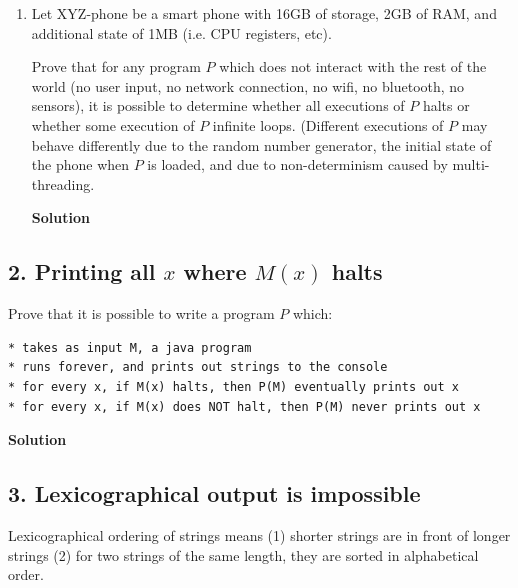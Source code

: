 \documentclass{article}\usepackage{amsmath,amssymb,amsthm,tikz,tkz-graph,color,chngpage,soul,hyperref,csquotes,graphicx,floatrow}\newcommand*{\QEDB}{\hfill\ensuremath{\square}}\newtheorem*{prop}{Proposition}\renewcommand{\theenumi}{\alph{enumi}}\usepackage[shortlabels]{enumitem}\usepackage[nobreak=true]{mdframed}\usetikzlibrary{matrix,calc}\MakeOuterQuote{"}\usepackage[margin=0.75in]{geometry} \newtheorem{theorem}{Theorem}
\begin{document}
\begin{enumerate}
\begin{mdframed}
\end{mdframed}
\item Let XYZ-phone be a smart phone with 16GB of storage, 2GB of RAM, and additional state of 1MB (i.e. CPU registers, etc).

\vspace{1mm}

\noindent Prove that for any program $P$ which does not interact with the rest of the world (no user input, no network connection, no wifi, no bluetooth, no sensors), it is possible to determine whether all executions of $P$ halts or whether some execution of $P$ infinite loops. (Different executions of $P$ may behave differently due to the random number generator, the initial state of the phone when $P$ is loaded, and due to non-determinism caused by multi-threading.
\begin{mdframed}
\textbf{Solution}

\end{mdframed}
\end{enumerate}

\clearpage

\subsection*{2. Printing all $x$ where $M(x)$ halts}
Prove that it is possible to write a program $P$ which:
\begin{center}
\begin{BVerbatim}
* takes as input M, a java program
* runs forever, and prints out strings to the console
* for every x, if M(x) halts, then P(M) eventually prints out x
* for every x, if M(x) does NOT halt, then P(M) never prints out x
\end{BVerbatim}
\end{center}
\begin{mdframed}
\textbf{Solution}

\end{mdframed}
\clearpage

\subsection*{3. Lexicographical output is impossible}
Lexicographical ordering of strings means (1) shorter strings are in front of longer strings (2) for two strings of the same length, they are sorted in alphabetical order.

\vspace{1mm}
\end{document}
